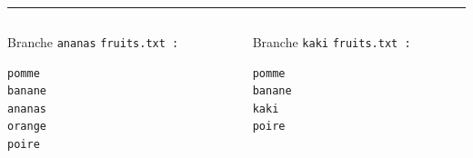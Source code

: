 \documentclass[table,tikz,12pt,svgnames]{beamer}
\begin{document}
\begin{frame}[fragile]
\color{gray}\rule{\linewidth}{3pt}
\color{black}
\vspace{-0.82em}

\PAUSE


\begin{columns}[T] %
	\begin{column}{.45\textwidth}
		\color{darkgreen}
		Branche \texttt{ananas}
		\texttt{fruits.txt :}
		\color{black}
		\begin{verbatim}
pomme
banane
ananas
orange
poire
		\end{verbatim}
	\end{column}%
	\begin{column}{.45\textwidth}
		\color{blue}%
		Branche \texttt{kaki}
		\texttt{fruits.txt :}		
		\color{black}
\begin{verbatim}
pomme
banane
kaki
poire
\end{verbatim}
\end{column}%
\end{columns}
\end{frame}
\end{document}

